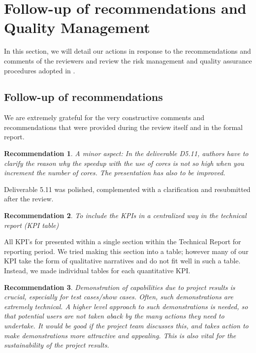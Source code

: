 \section{Follow-up of recommendations and Quality Management}

In this section, we will detail our actions in response to the recommendations and
comments of the reviewers and review the risk management and quality assurance procedures
adopted in \pn.

\subsection{Follow-up of recommendations}

We are extremely grateful for the very constructive comments and
recommendations that were provided during the review itself and in the
formal report.

\newtheorem{recommendation}{Recommendation}{}

\begin{recommendation}
  A minor aspect: In the deliverable D5.11, authors have to clarify
  the reason why the speedup with the use of cores is not so high when
  you increment the number of cores. The presentation has also to be
  improved.
\end{recommendation}

Deliverable 5.11 was polished, complemented with a clarification and
resubmitted after the review.

\begin{recommendation}
  To include the KPIs in a centralized way in the technical report (KPI table)
\end{recommendation}

All KPI's for presented within a single section within the Technical
Report for reporting period. We tried making this section into a
table; however many of our KPI take the form of qualitative narratives
and do not fit well in such a table. Instead, we made individual
tables for each quantitative KPI.

\begin{recommendation}
  Demonstration of capabilities due to project results is crucial,
  especially for test cases/show cases. Often, such demonstrations are
  extremely technical. A higher level approach to such demonstrations
  is needed, so that potential users are not taken aback by the many
  actions they need to undertake. It would be good if the project team
  discusses this, and takes action to make demonstrations more
  attractive and appealing. This is also vital for the sustainability
  of the project results.
\end{recommendation}

